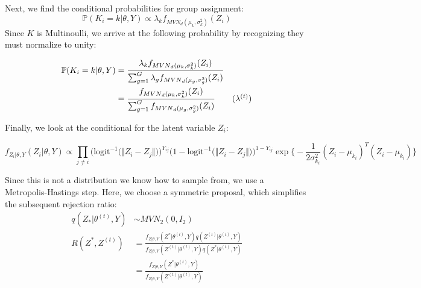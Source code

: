 \documentclass{article}
\begin{document}
Next, we find the conditional probabilities for group assignment:
\[\mathbb{P}(K_i = k | \theta, Y) \propto \lambda_k f_{{MVN}_d(\mu_k, \sigma_k^2)}(Z_i)\]
Since $K$ is Multinoulli, we arrive at the following probability by recognizing they must normalize to unity:

\begin{align*}
\mathbb{P}(K_i = k | \theta, Y) &= \frac{\lambda_k f_{{MVN}_d(\mu_k, \sigma_k^2)}(Z_i)}{\sum_{g=1}^G\lambda_g f_{{MVN}_d(\mu_g, \sigma_g^2)}(Z_i)} \\
&= \frac{f_{{MVN}_d(\mu_k, \sigma_k^2)}(Z_i)}{\sum_{g=1}^G f_{{MVN}_d(\mu_g, \sigma_g^2)}(Z_i)} \tag{$\lambda^{(t)}$}
\end{align*}

Finally, we look at the conditional for the latent variable $Z_i$:

\[f_{Z_i | \theta, Y}(Z_i | \theta, Y) \propto \prod_{j \neq i}\Big(\text{logit}^{-1}\big(\Vert Z_i-Z_j\Vert)\Big)^{Y_{ij}}\Big(1 - \text{logit}^{-1}\big(\Vert Z_i-Z_j\Vert)\Big)^{1 - Y_{ij}} \exp\Big\{-\frac{1}{2\sigma_{k_i}^2}(Z_i - \mu_{k_i})^T( Z_i - \mu_{k_i}) \Big\}\]

Since this is not a distribution we know how to sample from, we use a Metropolis-Hastings step. Here, we choose a symmetric proposal, which simplifies the subsequent rejection ratio:
\begin{align*}
q(Z_* | \theta^{(t)}, Y) &\sim MVN_2(0, I_2) \\
R(Z^*, Z^{(t)}) &= \frac{f_{Z | \theta, Y}(Z^* | \theta^{(t)}, Y)q(Z^{(t)} | \theta^{(t)}, Y)}{f_{Z | \theta, Y}(Z^{(t)} | \theta^{(t)}, Y)q(Z^* | \theta^{(t)}, Y)} \\
&= \frac{f_{Z | \theta, Y}(Z^* | \theta^{(t)}, Y)}{f_{Z | \theta, Y}(Z^{(t)} | \theta^{(t)}, Y)} 
\end{align*}
\end{document}

